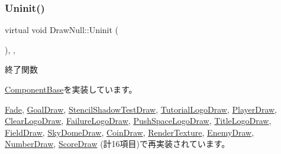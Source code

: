 \subsubsection{\texorpdfstring{Uninit()}{Uninit()}}
{\footnotesize\ttfamily virtual void Draw\+Null\+::\+Uninit (\begin{DoxyParamCaption}{ }\end{DoxyParamCaption})\hspace{0.3cm}{\ttfamily [inline]}, {\ttfamily [override]}, {\ttfamily [virtual]}}



終了関数 



\mbox{\hyperlink{class_component_base_a9f42beaf0383d6f629819579cab4de57}{Component\+Base}}を実装しています。



\mbox{\hyperlink{class_fade_ae77d06811869d3c8162a42c3e0e14f7f}{Fade}}, \mbox{\hyperlink{class_goal_draw_a01318a0606848a3ca8ca7b7acbf4df24}{Goal\+Draw}}, \mbox{\hyperlink{class_stencil_shadow_test_draw_ad0672bf4ecfc8091cf54ed6f2c76b618}{Stencil\+Shadow\+Test\+Draw}}, \mbox{\hyperlink{class_tutorial_logo_draw_a949fb70954e3df28f87b8ed5c61bf8f1}{Tutorial\+Logo\+Draw}}, \mbox{\hyperlink{class_player_draw_a917b2947914287f23d87ca75cd68f553}{Player\+Draw}}, \mbox{\hyperlink{class_clear_logo_draw_aa73db5b701e644f8e552ddb254a0a9aa}{Clear\+Logo\+Draw}}, \mbox{\hyperlink{class_failure_logo_draw_a97646253380b54f37565650e211f33cd}{Failure\+Logo\+Draw}}, \mbox{\hyperlink{class_push_space_logo_draw_a79021c1df43968d6008de74126d53fba}{Push\+Space\+Logo\+Draw}}, \mbox{\hyperlink{class_title_logo_draw_a07bbf9e8de5c7b9ee028408496c13c50}{Title\+Logo\+Draw}}, \mbox{\hyperlink{class_field_draw_a89a78212c141714d9e39e25e663aaeff}{Field\+Draw}}, \mbox{\hyperlink{class_sky_dome_draw_aee1c6b102a97033073b2559b8c2c328b}{Sky\+Dome\+Draw}}, \mbox{\hyperlink{class_coin_draw_a6484c22a5598e298f18e7cd6083cd551}{Coin\+Draw}}, \mbox{\hyperlink{class_render_texture_a0e55cd9b412d87dfe1f4b90f29f357c8}{Render\+Texture}}, \mbox{\hyperlink{class_enemy_draw_a2861dc0623b0be7726bc69a6a469190e}{Enemy\+Draw}}, \mbox{\hyperlink{class_number_draw_a2b203d101f23f0d3f584937ff5ad662a}{Number\+Draw}}, \mbox{\hyperlink{class_score_draw_aad744f8a7a1202e6ba8117c660f297ee}{Score\+Draw}} (計16項目)で再実装されています。

\mbox{\label{class_draw_null_a0149bcf84a34b138642ab7975ae46f30}} 
